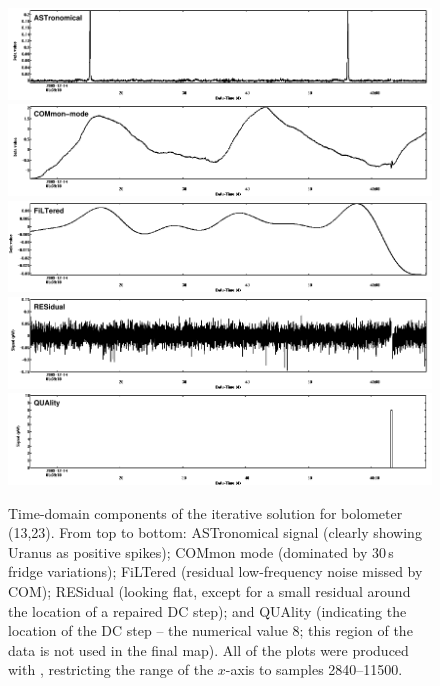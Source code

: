 \documentclass[twoside,11pt]{starlink}
\providecommand{\gaia}{\xref{\textsc{Gaia}}{sun214}{}}
\begin{document}
\begin{figure}
\begin{center}
\includegraphics[width=\linewidth]{sc19_iter_ast} \\
\includegraphics[width=\linewidth]{sc19_iter_com} \\
\includegraphics[width=\linewidth]{sc19_iter_flt} \\
\includegraphics[width=\linewidth]{sc19_iter_res} \\
\includegraphics[width=\linewidth]{sc19_iter_qua} \\
\caption{Time-domain components of the iterative solution for
  bolometer (13,23). From top to bottom: ASTronomical signal (clearly
  showing Uranus as positive spikes); COMmon mode (dominated by 30\,s
  fridge variations); FiLTered (residual low-frequency noise missed by
  COM); RESidual (looking flat, except for a small residual around the
  location of a repaired DC step); and QUAlity (indicating the
  location of the DC step -- the numerical value 8; this region of the
  data is not used in the final map). All of the plots were produced
  with \gaia, restricting the range of the $x$-axis to samples
  2840--11500.}
\label{fig:itercomp}
\end{center}
\end{figure}
\end{document}
